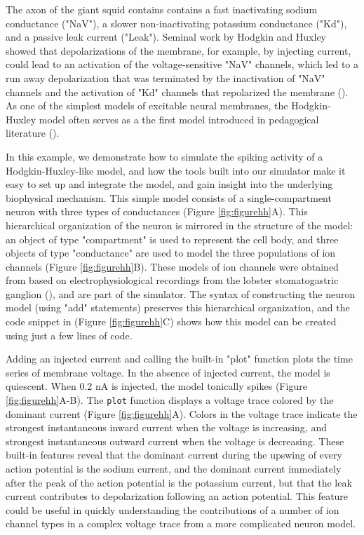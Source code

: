 \documentclass{frontiersSCNS} %
\begin{document}
The axon of the giant squid contains contains a fast inactivating sodium conductance ("NaV"), a slower non-inactivating potassium conductance ("Kd"), and a passive leak current ("Leak"). Seminal work by Hodgkin and Huxley showed that depolarizations of the membrane, for example, by injecting current, could lead to an activation of the voltage-sensitive "NaV" channels, which led to a run away depolarization that was terminated by the inactivation of "NaV" channels and the activation of "Kd" channels that repolarized the membrane (\cite{hodgkinComponentsMembraneConductance1952, hodgkinMeasurementCurrentvoltageRelations1952}). As one of the simplest models of excitable neural membranes, the Hodgkin-Huxley model often serves as a the first model introduced in pedagogical literature (\cite{dayanTheoreticalNeuroscience2001, sterrattPrinciplesComputationalModelling2011, trappenbergFundamentalsComputationalNeuroscience2010}).


In this example, we demonstrate how to simulate the spiking activity of a Hodgkin-Huxley-like model, and how the tools built into our simulator make it easy to set up and integrate the model, and gain insight into the underlying biophysical mechanism. This simple model consists of a single-compartment neuron with three types of conductances  (Figure \ref{fig:figurehh}A). This hierarchical organization of the neuron is mirrored in the structure of the model: an object of type "compartment" is used to represent the cell body, and three objects of type "conductance" are used to model the three populations of ion channels (Figure \ref{fig:figurehh}B). These models of ion channels were obtained from \cite{liuModelNeuronActivityDependent1998} based on electrophysiological recordings from the lobster stomatogastric ganglion (\cite{turrigianoSelectiveRegulationCurrent1995}), and are part of the simulator. The syntax of constructing the neuron model (using "add" statements) preserves this hierarchical organization, and the code snippet in (Figure \ref{fig:figurehh}C) shows how this model can be created using just a few lines of code.

Adding an injected current and calling the built-in "plot" function plots the time series of membrane voltage. In the absence of injected current, the model is quiescent. When 0.2 nA is injected, the model tonically spikes (Figure \ref{fig:figurehh}A-B).  The \texttt{plot} function displays a voltage trace colored by the dominant current (Figure \ref{fig:figurehh}A). Colors in the voltage trace indicate the strongest instantaneous inward current when the voltage is increasing, and strongest instantaneous outward current when the voltage is decreasing. These built-in features reveal that the dominant current during the upswing of every action potential is the sodium current, and the dominant current immediately after the peak of the action potential is the potassium current, but that the leak current contributes to depolarization following an action potential. This feature could be useful in quickly understanding the contributions of a number of ion channel types in a complex voltage trace from a more complicated neuron model.
\end{document}
